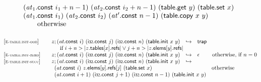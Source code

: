 $$\begin{array}[t]{@{}lrcl@{}l@{}}
{\begin{array}[t]{@{}l@{}l@{}l@{}}
\begin{array}[t]{@{}l@{}} ({\mathit{at}}_1{.}\mathsf{const}~i_1 + n - 1)~({\mathit{at}}_2{.}\mathsf{const}~i_2 + n - 1)~(\mathsf{table{.}get}~y)~(\mathsf{table{.}set}~x) \\
  ({\mathit{at}}_1{.}\mathsf{const}~i_1)~({\mathit{at}}_2{.}\mathsf{const}~i_2)~({\mathit{at}'}{.}\mathsf{const}~n - 1)~(\mathsf{table{.}copy}~x~y) \end{array} & & \\
 \multicolumn{3}{@{}l@{}}{\quad
\begin{array}[t]{@{}l@{}}
\quad \mbox{otherwise} \\
\end{array}
} \\
\end{array}
} \\
\end{array}
$$

\vspace{1ex}

$$
\begin{array}[t]{@{}lrcl@{}l@{}}
{[\textsc{\scriptsize E{-}table.init{-}oob}]} \quad & z ; ({\mathit{at}}{.}\mathsf{const}~i)~(\mathsf{i{\scriptstyle 32}}{.}\mathsf{const}~j)~(\mathsf{i{\scriptstyle 32}}{.}\mathsf{const}~n)~(\mathsf{table{.}init}~x~y) & \hookrightarrow & \mathsf{trap} &  \\
& \multicolumn{4}{@{}l@{}}{\quad
\quad \mbox{if}~ i + n > {|z{.}\mathsf{tables}{}[x]{.}\mathsf{refs}|} \lor j + n > {|z{.}\mathsf{elems}{}[y]{.}\mathsf{refs}|}
} \\
{[\textsc{\scriptsize E{-}table.init{-}zero}]} \quad & z ; ({\mathit{at}}{.}\mathsf{const}~i)~(\mathsf{i{\scriptstyle 32}}{.}\mathsf{const}~j)~(\mathsf{i{\scriptstyle 32}}{.}\mathsf{const}~n)~(\mathsf{table{.}init}~x~y) & \hookrightarrow & \epsilon & \quad \mbox{otherwise, if}~ n = 0 \\
{[\textsc{\scriptsize E{-}table.init{-}succ}]} \quad & z ; ({\mathit{at}}{.}\mathsf{const}~i)~(\mathsf{i{\scriptstyle 32}}{.}\mathsf{const}~j)~(\mathsf{i{\scriptstyle 32}}{.}\mathsf{const}~n)~(\mathsf{table{.}init}~x~y) & \hookrightarrow & & \\
& \multicolumn{4}{@{}l@{}}{\quad
\begin{array}[t]{@{}l@{}l@{}}
\begin{array}[t]{@{}l@{}} ({\mathit{at}}{.}\mathsf{const}~i)~z{.}\mathsf{elems}{}[y]{.}\mathsf{refs}{}[j]~(\mathsf{table{.}set}~x) \\
  ({\mathit{at}}{.}\mathsf{const}~i + 1)~(\mathsf{i{\scriptstyle 32}}{.}\mathsf{const}~j + 1)~(\mathsf{i{\scriptstyle 32}}{.}\mathsf{const}~n - 1)~(\mathsf{table{.}init}~x~y) \end{array} & \quad \mbox{otherwise} \\
\end{array}
} \\
\end{array}
$$

